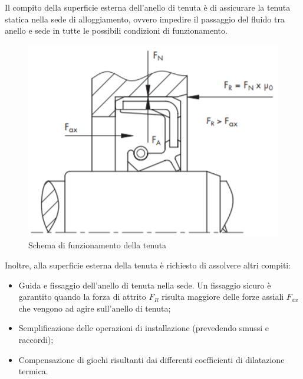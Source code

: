 Il compito della superficie esterna dell'anello di tenuta è di assicurare la tenuta statica nella sede di alloggiamento, ovvero impedire il passaggio del fluido tra anello e sede in tutte le possibili condizioni di funzionamento. 

\begin{figure}[h]
    \centering
    \includegraphics[scale=0.6]{Immagini/FunzionamentoParaolio2.png}
    \caption{Schema di funzionamento della tenuta}
    \label{fig:FunzionamentoParaolio2}
\end{figure}

Inoltre, alla superficie esterna della tenuta è richiesto di assolvere altri compiti:
\begin{itemize}
    \item Guida e fissaggio dell'anello di tenuta nella sede. Un fissaggio sicuro è garantito quando la forza di attrito $F_R$ risulta maggiore delle forze assiali $F_{ax}$ che vengono ad agire sull'anello di tenuta;
    \item Semplificazione delle operazioni di installazione (prevedendo smussi e raccordi);
    \item Compensazione di giochi risultanti dai differenti coefficienti di dilatazione termica. 
\end{itemize}

